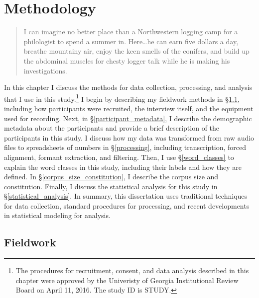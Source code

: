 \chapter{Methodology}
\label{ch:methodology}
\setcounter{footnote}{1}

\begin{quote}
    I can imagine no better place than a Northwestern logging camp for a philologist to spend a summer in. Here\ldots he can earn five dollars a day, breathe mountainy air, enjoy the keen smells of the conifers, and build up the abdominal muscles for chesty logger talk while he is making his investigations. \citep[139--140]{stevens_1925}
\end{quote}

In this chapter I discuss the methods for data collection, processing, and analysis that I use in this study.\footnote{The procedures for recruitment, consent, and data analysis described in this chapter were approved by the Univeristy of Georgia Institutional Review Board on April 11, 2016. The study ID is STUDY.} I begin by describing my fieldwork methods in \S\ref{fieldwork}, including how participants were recruited, the interview itself, and the equipment used for recording. Next, in \S\ref{participant_metadata}, I describe the demographic metadata about the participants and provide a brief description of the participants in this study. I discuss how my data was transformed from raw audio files to spreadsheets of numbers in \S\ref{processing}, including transcription, forced alignment, formant extraction, and filtering. Then, I use \S\ref{word_classes} to explain the word classes in this study, including their labels and how they are defined. In \S\ref{corpus_size_constitution}, I describe the corpus size and constitution. Finally, I discuss the statistical analysis for this study in \S\ref{statistical_analysis}. In summary, this dissertation uses traditional techniques for data collection, standard procedures for processing, and recent developments in statistical modeling for analysis.


\section{Fieldwork}
\label{fieldwork}


